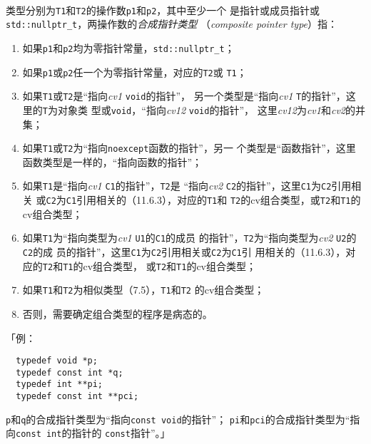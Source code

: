 \paragraph{}
类型分别为\texttt{T1}和\texttt{T2}的操作数\texttt{p1}和\texttt{p2}，其中至少一个
是指针或成员指针或\texttt{std::nullptr\_t}，两操作数的\textit{合成指针类型}
（\textit{composite pointer type}）指：
\begin{enumerate}
  \item{如果\texttt{p1}和\texttt{p2}均为零指针常量，\texttt{std::nullptr\_t}；}
  \item{如果\texttt{p1}或\texttt{p2}任一个为零指针常量，对应的\texttt{T2}或
    \texttt{T1}；}
  \item{如果\texttt{T1}或\texttt{T2}是``指向\textit{cv1} \texttt{void}的指针''，
    另一个类型是``指向\textit{cv1} \texttt{T}的指针''，这里的\texttt{T}为对象类
    型或\texttt{void}，``指向\textit{cv12} \texttt{void}的指针''，
    这里\textit{cv12}为\textit{cv1}和\textit{cv2}的并集；}
  \item{如果\texttt{T1}或\texttt{T2}为``指向\texttt{noexcept}函数的指针''，另一
    个类型是``函数指针''，这里函数类型是一样的，``指向函数的指针''；}
  \item{如果\texttt{T1}是``指向\textit{cv1} \texttt{C1}的指针''，\texttt{T2}是
    ``指向\textit{cv2} \texttt{C2}的指针''，这里\texttt{C1}为\texttt{C2}引用相关
    或\texttt{C2}为\texttt{C1}引用相关的（11.6.3），对应的\texttt{T1}和
    \texttt{T2}的cv组合类型，或\texttt{T2}和\texttt{T1}的cv组合类型；}
  \item{如果\texttt{T1}为``指向类型为\textit{cv1} \texttt{U1}的\texttt{C1}的成员
    的指针''，\texttt{T2}为``指向类型为\textit{cv2} \texttt{U2}的\texttt{C2}的成
    员的指针''，这里\texttt{C1}为\texttt{C2}引用相关或\texttt{C2}为\texttt{C1}引
    用相关的（11.6.3），对应的\texttt{T2}和\texttt{T1}的cv组合类型，
    或\texttt{T2}和\texttt{T1}的cv组合类型；}
  \item{如果\texttt{T1}和\texttt{T2}为相似类型（7.5），\texttt{T1}和\texttt{T2}
    的cv组合类型；}
  \item{否则，需要确定组合类型的程序是病态的。}
\end{enumerate}
「例：
\begin{lstlisting}
  typedef void *p;
  typedef const int *q;
  typedef int **pi;
  typedef const int **pci;
\end{lstlisting}
\texttt{p}和\texttt{q}的合成指针类型为``指向\texttt{const void}的指针''；
\texttt{pi}和\texttt{pci}的合成指针类型为``指向\texttt{const int}的指针的
\texttt{const}指针''。」

